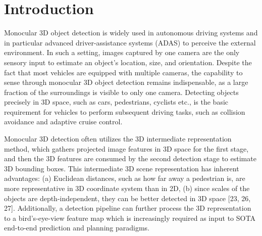 \documentclass[10pt,twocolumn,letterpaper]{article}
\begin{document}
\section{Introduction}
\label{sec:intro}
Monocular 3D object detection is widely used in autonomous driving systems and in particular advanced driver-assistance systems (ADAS) to perceive the external environment. In such a setting, images captured by one camera are the only sensory input to estimate an object's location, size, and orientation. Despite the fact that most vehicles are equipped with multiple cameras, the capability to sense through monocular 3D object detection remains indispensable, as a large fraction of the surroundings is visible to only one camera. Detecting objects precisely in 3D space, such as cars, pedestrians, cyclists etc., is the basic requirement for vehicles to perform subsequent driving tasks, such as collision avoidance and adaptive cruise control.

Monocular 3D detection often utilizes the 3D intermediate representation method\cite{10.1007/978-3-030-58568-6_12, BMVC2019, reading2021categorical, weng2019monocular, ma2019accurate}, which gathers projected image features in 3D space for the first stage, and then the 3D features are consumed by the second detection stage to estimate 3D bounding boxes. This intermediate 3D scene representation has inherent advantages\cite{10.1007/978-3-030-58568-6_12, BMVC2019, reading2021categorical}: (a) Euclidean distances, such as how far away a pedestrian is, are more representative in 3D coordinate system than in 2D, (b) since scales of the objects are depth-independent, they can be better detected in 3D space [23, 26, 27]. Additionally, a detection pipeline can further process the 3D representation to a bird's-eye-view feature map which is increasingly required as input to SOTA end-to-end prediction and planning paradigms.
\end{document}
